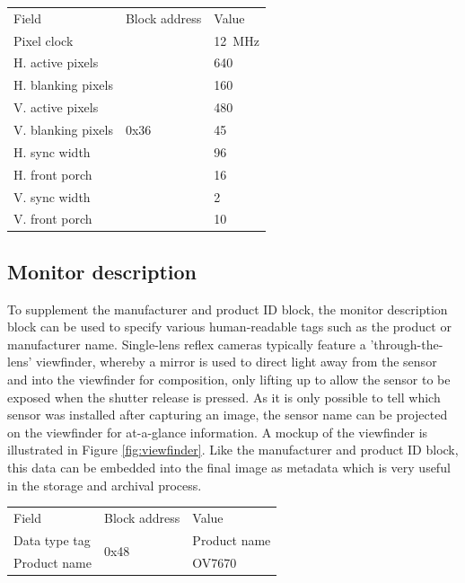 \begin{table}
    \begin{tabular}{lll}
        Field               & Block address             & Value                 \\
        Pixel clock         & \multirow{9}{*}{0x36}     & \SI{12}{\mega\hertz}  \\
        H. active pixels    &                           & 640                   \\
        H. blanking pixels  &                           & 160                   \\
        V. active pixels    &                           & 480                   \\ 
        V. blanking pixels  &                           & 45                    \\
        H. sync width       &                           & 96                    \\
        H. front porch      &                           & 16                    \\
        V. sync width       &                           & 2                     \\
        V. front porch      &                           & 10                    \\
    \end{tabular}
\end{table}

\subsection{Monitor description}
To supplement the manufacturer and product ID block, the monitor description block can be used to specify various human-readable tags such as the product or manufacturer name. Single-lens reflex cameras typically feature a 'through-the-lens' viewfinder, whereby a mirror is used to direct light away from the sensor and into the viewfinder for composition, only lifting up to allow the sensor to be exposed when the shutter release is pressed. As it is only possible to tell which sensor was installed after capturing an image, the sensor name can be projected on the viewfinder for at-a-glance information. A mockup of the viewfinder is illustrated in Figure \ref{fig:viewfinder}. Like the manufacturer and product ID block, this data can be embedded into the final image as metadata which is very useful in the storage and archival process.

\begin{table}
    \begin{tabular}{lll}
        Field               & Block address             & Value             \\
        Data type tag       & \multirow{2}{*}{0x48}     & Product name      \\
        Product name        &                           & OV7670            \\
    \end{tabular}
\end{table}

